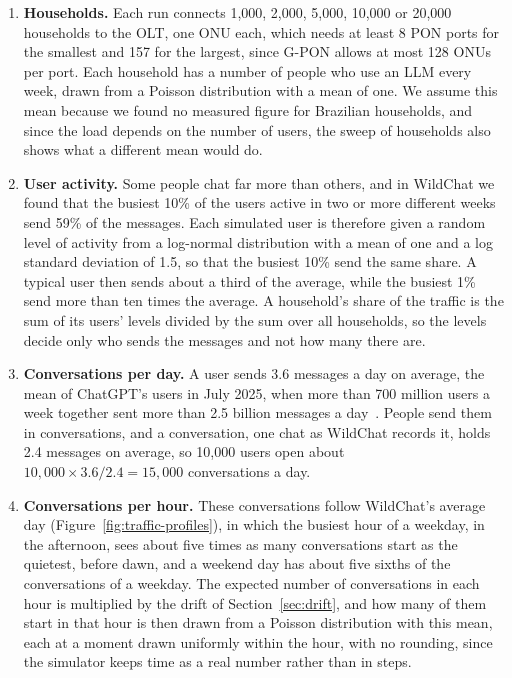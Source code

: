 \documentclass[cic,dipl,english]{infufrgs}
\begin{document}
\begin{enumerate}
  \item \textbf{Households.} Each run connects 1,000, 2,000, 5,000, 10,000 or 20,000 households to
  the OLT, one ONU each, which needs at least 8 PON ports for the smallest and 157 for the largest,
  since G-PON allows at most 128 ONUs per port. Each household has a number of people who use an LLM
  every week, drawn from a Poisson distribution with a mean of one. We assume this mean because we
  found no measured figure for Brazilian households, and since the load depends on the number of
  users, the sweep of households also shows what a different mean would do.
  \item \textbf{User activity.} Some people chat far more than others, and in WildChat we found that
  the busiest 10\% of the users active in two or more different weeks send 59\% of the messages.
  Each simulated user is therefore given a random level of activity from a log-normal distribution
  with a mean of one and a log standard deviation of 1.5, so that the busiest 10\% send the same
  share. A typical user then sends about a third of the average, while the busiest 1\% send more
  than ten times the average. A household's share
  of the traffic is the sum of its users' levels divided by the sum over all households, so the
  levels decide only who sends the messages and not how many there are.
  \item \textbf{Conversations per day.} A user sends 3.6 messages a day on average, the mean of
  ChatGPT's users in July 2025, when more than 700 million users a week together sent more than 2.5
  billion messages a day~\cite{chatterji2025how}. People send them in conversations, and a
  conversation, one chat as WildChat records it, holds 2.4 messages on average, so 10,000 users
  open about $10{,}000 \times 3.6 / 2.4 = 15{,}000$ conversations a day.
  \item \textbf{Conversations per hour.} These conversations follow WildChat's average day
  (Figure~\ref{fig:traffic-profiles}), in which
  the busiest hour of a weekday, in the afternoon, sees about five times as many conversations start
  as the quietest, before dawn, and a weekend day has about five sixths of the conversations of a
  weekday. The expected number of conversations in each hour is multiplied by the drift of
  Section~\ref{sec:drift}, and how many of them start in that hour is then drawn from a Poisson
  distribution with this mean, each at a moment drawn uniformly within the hour, with no
  rounding, since the simulator keeps time as a real number rather than in steps.

\end{enumerate}
\end{document}
